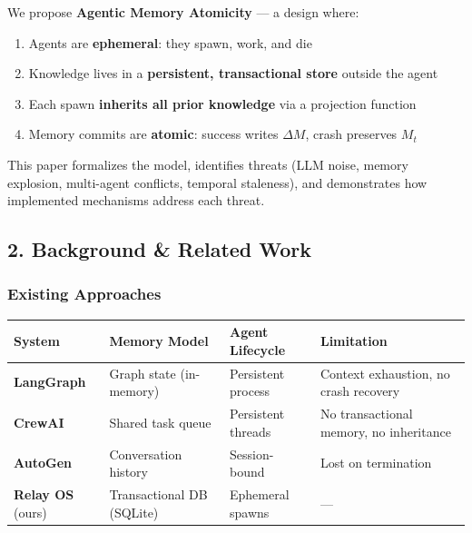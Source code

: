 \documentclass[11pt]{article}
\providecommand{\tightlist}{%
      \setlength{\itemsep}{0pt}\setlength{\parskip}{0pt}}
\begin{document}
We propose \textbf{Agentic Memory Atomicity} --- a design where:

\begin{enumerate}
\def\labelenumi{\arabic{enumi}.}
\tightlist
\item
  Agents are \textbf{ephemeral}: they spawn, work, and die
\item
  Knowledge lives in a \textbf{persistent, transactional store} outside
  the agent
\item
  Each spawn \textbf{inherits all prior knowledge} via a projection
  function
\item
  Memory commits are \textbf{atomic}: success writes \(\Delta M\), crash
  preserves \(M_t\)
\end{enumerate}

This paper formalizes the model, identifies threats (LLM noise, memory
explosion, multi-agent conflicts, temporal staleness), and demonstrates
how implemented mechanisms address each threat.

    \subsection{2. Background \& Related
Work}\label{background-related-work}

\subsubsection{Existing Approaches}\label{existing-approaches}

\begin{longtable}[]{@{}
  >{\raggedright\arraybackslash}p{}
  >{\raggedright\arraybackslash}p{}
  >{\raggedright\arraybackslash}p{}
  >{\raggedright\arraybackslash}p{}@{}}
\toprule\noalign{}
\begin{minipage}[b]{\linewidth}\raggedright
System
\end{minipage} & \begin{minipage}[b]{\linewidth}\raggedright
Memory Model
\end{minipage} & \begin{minipage}[b]{\linewidth}\raggedright
Agent Lifecycle
\end{minipage} & \begin{minipage}[b]{\linewidth}\raggedright
Limitation
\end{minipage} \\
\midrule\noalign{}
\endhead
\bottomrule\noalign{}
\endlastfoot
\textbf{LangGraph} & Graph state (in-memory) & Persistent process &
Context exhaustion, no crash recovery \\
\textbf{CrewAI} & Shared task queue & Persistent threads & No
transactional memory, no inheritance \\
\textbf{AutoGen} & Conversation history & Session-bound & Lost on
termination \\
\textbf{Relay OS} (ours) & Transactional DB (SQLite) & Ephemeral spawns
& --- \\
\end{longtable}
\end{document}
